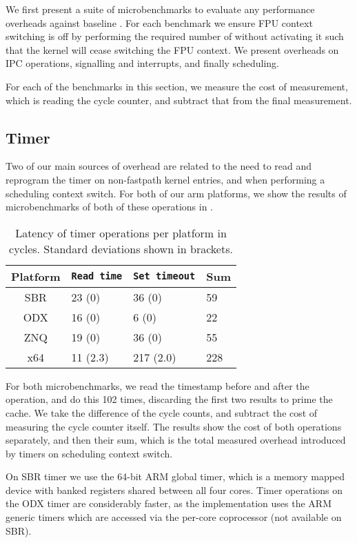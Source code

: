 We first present a suite of microbenchmarks to evaluate any performance overheads against baseline
\selfour.
For each benchmark we ensure \gls{FPU} context switching is off by performing the required number of
without activating it such that the kernel will cease switching the FPU context. We present
overheads on IPC operations, signalling and interrupts, and finally scheduling. 

For each of the benchmarks in this section, we measure the cost of measurement, which is reading the
cycle counter, and subtract that from the final measurement.

\subsection{Timer}

Two of our main sources of overhead are related to the need to read and reprogram the timer on
non-fastpath kernel entries, and when performing a scheduling context switch. For both of our arm
platforms, we show the results of microbenchmarks of both of these operations in .

\begin{table}[ht]\centering
\begin{tabular}{|c|l|l|l|}\hline
    \textbf{Platform} & \texttt{Read time} & \texttt{Set timeout} & \textbf{Sum} \\\hline
    SBR              &     23 (0) & 36 (0)  & 59 \\\hline
    ODX              &     16 (0) & 6 (0) & 22 \\\hline
    ZNQ              &     19 (0) & 36 (0) & 55 \\\hline
    x64              &     11 (2.3)   & 217 (2.0) & 228    \\\hline 
\end{tabular}
\caption{Latency of timer operations per platform in cycles. Standard deviations shown
in brackets.}
\label{t:timer}
\end{table}

For both microbenchmarks, we read the timestamp before and after the operation, and do this 102
times, discarding the first two results to prime the cache.  We take the difference of the cycle
counts, and subtract the cost of measuring the cycle counter itself. The results show the cost of
both operations separately, and then their sum, which is the total measured overhead introduced by timers on
scheduling context switch.

On SBR timer we use the 64-bit ARM global timer, which is a memory mapped device with banked registers shared
between all four cores. Timer operations on the ODX timer are considerably faster, as the
implementation uses the ARM generic timers which are accessed via the per-core coprocessor (not
available on SBR). 


